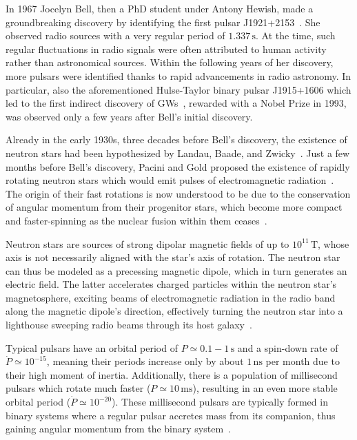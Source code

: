 In 1967 Jocelyn Bell, then a PhD student under Antony Hewish, made a groundbreaking discovery by identifying the first pulsar J1921+2153~\cite{Hewish:1968bj}. She observed radio sources with a very regular period of $1.337 \, \text{s}$. At the time, such regular fluctuations in radio signals were often  attributed to human activity rather than astronomical sources. Within the following years of her discovery, more pulsars were identified thanks to rapid advancements in radio astronomy. In particular, also the aforementioned Hulse-Taylor binary pulsar J1915+1606 which led to the first indirect discovery of \acp{GW}~\cite{Hulse:1974eb}, rewarded with a Nobel Prize in 1993, was observed only a few years after Bell's initial discovery.

Already in the early 1930s, three decades before Bell's discovery, the existence of neutron stars had been hypothesized by Landau, Baade, and Zwicky~\cite{Landau:1932uwv, Baade:1934}. Just a few months before Bell's discovery, Pacini and Gold proposed the existence of rapidly rotating neutron stars which would emit pulses of electromagnetic radiation~\cite{Pacini:1968, Gold:1968zf}. The origin  of their fast rotations is now understood to be due to the conservation of angular momentum from their progenitor stars, which become more compact and faster-spinning as the nuclear fusion within them ceases~\cite{Lorimer:2004}.

Neutron stars are sources of strong dipolar magnetic fields of up to $10^{11} \, \text{T}$, whose axis is not necessarily aligned with the star's axis of rotation. The neutron star can thus be modeled as a precessing magnetic dipole, which in turn generates an electric field.  The latter accelerates charged particles within the neutron star's magnetosphere, exciting beams of electromagnetic radiation in the radio band along the magnetic dipole's direction, effectively turning the neutron star into a lighthouse sweeping radio beams through its host galaxy~\cite{Goldreich:1969sb}.

Typical pulsars have an orbital period of $P \simeq 0.1 - 1 \, \text{s}$ and a spin-down rate of $\dot{P} \simeq 10^{-15}$, meaning their periods increase only by about $1 \, \text{ns}$ per month due to their  high moment of inertia. Additionally, there is a population of millisecond pulsars which rotate much faster ($P \simeq 10 \, \text{ms}$), resulting in an even more stable orbital period ($\dot{P} \simeq 10^{-20}$). These millisecond pulsars are typically formed in binary systems where a regular pulsar accretes mass from its companion, thus gaining angular momentum from the binary system~\cite{Lorimer:2004}. 

